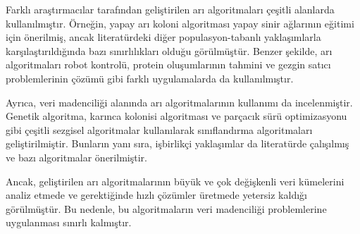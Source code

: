 \documentclass[12pt,a4paper]{article}
\begin{document}
\begin{enumerate}
Farklı araştırmacılar tarafından geliştirilen arı algoritmaları çeşitli alanlarda kullanılmıştır. Örneğin, yapay arı koloni algoritması yapay sinir ağlarının eğitimi için önerilmiş, ancak literatürdeki diğer populasyon-tabanlı yaklaşımlarla karşılaştırıldığında bazı sınırlılıkları olduğu görülmüştür. Benzer şekilde, arı algoritmaları robot kontrolü, protein oluşumlarının tahmini ve gezgin satıcı problemlerinin çözümü gibi farklı uygulamalarda da kullanılmıştır.

Ayrıca, veri madenciliği alanında arı algoritmalarının kullanımı da incelenmiştir. Genetik algoritma, karınca kolonisi algoritması ve parçacık sürü optimizasyonu gibi çeşitli sezgisel algoritmalar kullanılarak sınıflandırma algoritmaları geliştirilmiştir. Bunların yanı sıra, işbirlikçi yaklaşımlar da literatürde çalışılmış ve bazı algoritmalar önerilmiştir.

Ancak, geliştirilen arı algoritmalarının büyük ve çok değişkenli veri kümelerini analiz etmede ve gerektiğinde hızlı çözümler üretmede yetersiz kaldığı görülmüştür. Bu nedenle, bu algoritmaların veri madenciliği problemlerine uygulanması sınırlı kalmıştır.


\end{enumerate}
\end{document}
